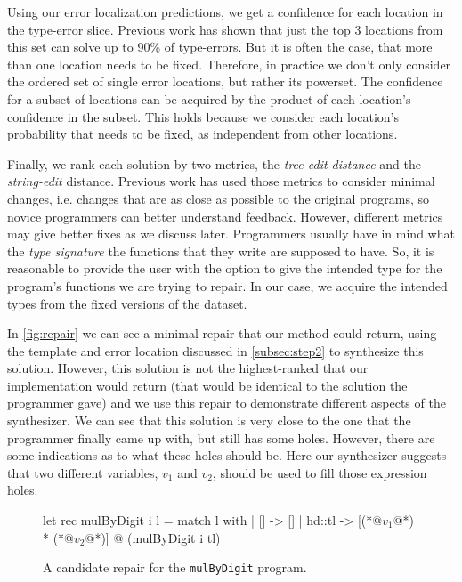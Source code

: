  Using our error localization
predictions, we get a confidence for each location in the type-error slice.
Previous work has shown that just the top 3 locations from this set can solve up
to 90\% of type-errors. But it is often the case, that more than one location
needs to be fixed. Therefore, in practice we don't only consider the ordered set
of single error locations, but rather its powerset. The confidence for a subset
of locations can be acquired by the product of each location’s confidence in the
subset. This holds because we consider each location’s probability that needs to
be fixed, as independent from other locations.


 Finally, we rank each solution by two metrics, the
\emph{tree-edit distance} and the \emph{string-edit} distance. Previous work has
used those metrics to consider minimal changes, i.e. changes that are as close
as possible to the original programs, so novice programmers can better
understand feedback. However, different metrics may give better fixes as we
discuss later. Programmers usually have in mind what the \emph{type signature}
the functions that they write are supposed to have. So, it is reasonable to
provide the user with the option to give the intended type for the program's
functions we are trying to repair. In our case, we acquire the intended types
from the fixed versions of the dataset.

 In \autoref{fig:repair} we can see a minimal repair that our
method could return, using the template and error location discussed in
\autoref{subsec:step2} to synthesize this solution. However, this solution is
not the highest-ranked that our implementation would return (that would be
identical to the solution the programmer gave) and we use this repair to
demonstrate different aspects of the synthesizer. We can see that this solution
is very close to the one that the programmer finally came up with, but still has
some holes. However, there are some indications as to what these holes should
be. Here our synthesizer suggests that two different variables, $v_1$ and $v_2$,
should be used to fill those expression holes.

\begin{figure}[ht]
\begin{ecode}
let rec mulByDigit i l =
  match l with
  | []     -> []
  | hd::tl -> [(*@$v_1$@*) * (*@$v_2$@*)] @ (mulByDigit i tl)
\end{ecode}
\caption{A candidate repair for the \texttt{mulByDigit} program.}
\label{fig:repair}
\end{figure}
